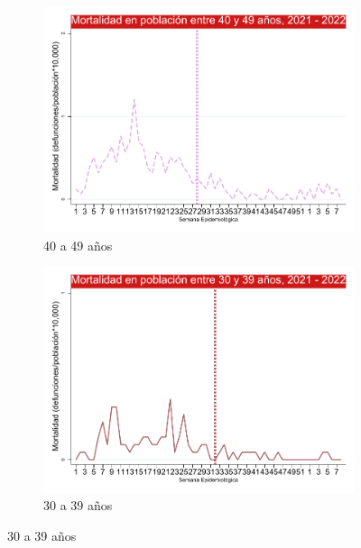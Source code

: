 \documentclass[12pt,a4paper,openany]{book}
\begin{document}
\begin{figure}[h]
	\vspace{10mm}
	\begin{subfigure}[b]{0.45\textwidth}
		\centering
		\includegraphics[width=\textwidth]{../figuras/mortalidad_edad_40.pdf}
		\caption{40 a 49 años}
	\end{subfigure}
	\hfill
	\begin{subfigure}[b]{0.45\textwidth}
		\centering
		\includegraphics[width=\textwidth]{../figuras/mortalidad_edad_30.pdf}
		\caption{30 a 39 años}
	\end{subfigure}
	\end{figure}
\end{document}

